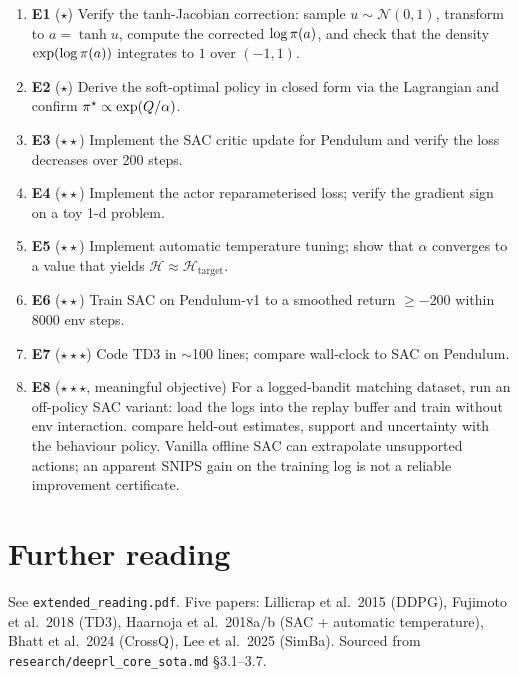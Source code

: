 \documentclass[11pt,oneside]{scrbook}
\begin{document}
\begin{enumerate}[label={},leftmargin=0pt,labelsep=0pt]
  \item \textbf{E1} ($\star$) Verify the tanh-Jacobian correction: sample $u \sim \mathcal{N}(0, 1)$, transform to $a=\tanh u$, compute the corrected $\log\pi(a)$, and check that the density $\exp(\log\pi(a))$ integrates to $1$ over $(-1,1)$.
  \item \textbf{E2} ($\star$) Derive the soft-optimal policy in closed form via the Lagrangian and confirm $\pi^\star \propto \exp(Q/\alpha)$.
  \item \textbf{E3} ($\star\star$) Implement the SAC critic update for Pendulum and verify the loss decreases over 200 steps.
  \item \textbf{E4} ($\star\star$) Implement the actor reparameterised loss; verify the gradient sign on a toy 1-d problem.
  \item \textbf{E5} ($\star\star$) Implement automatic temperature tuning; show that $\alpha$ converges to a value that yields $\mathcal{H} \approx \mathcal{H}_\text{target}$.
  \item \textbf{E6} ($\star\star$) Train SAC on Pendulum-v1 to a smoothed return $\ge -200$ within 8000 env steps.
  \item \textbf{E7} ($\star\star\star$) Code TD3 in $\sim$100 lines; compare wall-clock to SAC on Pendulum.
  \item \textbf{E8} ($\star\star\star$, meaningful objective) For a logged-bandit matching dataset, run an off-policy SAC variant: load the logs into the replay buffer and train without env interaction. compare held-out estimates, support and uncertainty with the behaviour
policy. Vanilla offline SAC can extrapolate unsupported actions; an apparent
SNIPS gain on the training log is not a reliable improvement certificate.
\end{enumerate}

\chapter{Further reading}

See \texttt{extended\_reading.pdf}. Five papers: Lillicrap et al.\ 2015 (DDPG), Fujimoto et al.\ 2018 (TD3), Haarnoja et al.\ 2018a/b (SAC + automatic temperature), Bhatt et al.\ 2024 (CrossQ), Lee et al.\ 2025 (SimBa). Sourced from \texttt{research/deeprl\_core\_sota.md} \S 3.1--3.7.
\end{document}
